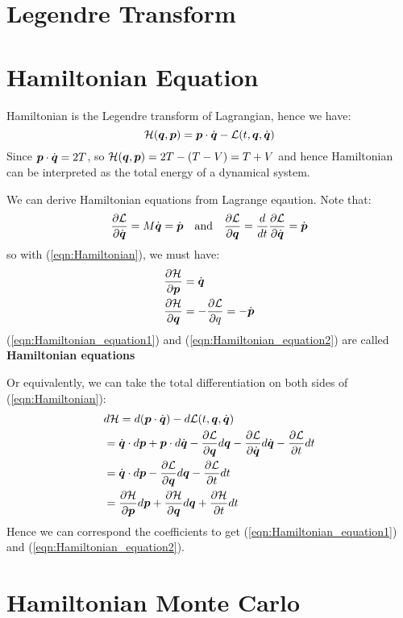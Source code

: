 \documentclass[hidelinks]{article}[12pt]
\begin{document}
\section{Legendre Transform}



\section{Hamiltonian Equation}
Hamiltonian is the Legendre transform of Lagrangian, hence we have:
\begin{equation}
{\cal H}(\boldsymbol{q}, \boldsymbol{p}) = \boldsymbol{p} \cdot \dot{\boldsymbol{q}} - {\cal L}(t, \boldsymbol{q}, \dot{\boldsymbol{q}}) \label{eqn:Hamiltonian}
\end{equation}
Since $\boldsymbol{p}\cdot \dot{\boldsymbol{q}} = 2T$, so ${\cal H}(\boldsymbol{q}, \boldsymbol{p}) = 2T - (T - V) = T + V$ and hence Hamiltonian can be interpreted as the total energy of a dynamical system.


We can derive Hamiltonian equations from Lagrange eqaution. Note that:\[\frac{\partial{{\cal L}}}{\partial{\dot{\boldsymbol{q}}}} = M\dot{\boldsymbol{q}} = \dot{\boldsymbol{p}} \quad \text{and} \quad \frac{\partial{{\cal L}}}{\partial{\boldsymbol{q}}} = \frac{d}{dt}\frac{\partial{{\cal L}}}{\partial{\dot{\boldsymbol{q}}}} = \dot{\boldsymbol{p}}\]
so with (\ref{eqn:Hamiltonian}), we must have:
\begin{align}
& \frac{\partial{{\cal H}}}{\partial{\boldsymbol{p}}} = \dot{\boldsymbol{q}} \label{eqn:Hamiltonian_equation1}\\
& \frac{\partial{{\cal H}}}{\partial{\boldsymbol{q}}} = -\frac{\partial{{\cal L}}}{\partial{q}} = - \dot{\boldsymbol{p}} \label{eqn:Hamiltonian_equation2}
\end{align}
(\ref{eqn:Hamiltonian_equation1}) and (\ref{eqn:Hamiltonian_equation2}) are called \textbf{Hamiltonian equations}

Or equivalently, we can take the total differentiation on both sides of (\ref{eqn:Hamiltonian}):
\begin{align*}
& d{\cal H} = d(\boldsymbol{p}\cdot \dot{\boldsymbol{q}}) - d{\cal L}(t, \boldsymbol{q}, \dot{\boldsymbol{q}})\\
& = \dot{\boldsymbol{q}}\cdot d\boldsymbol{p} + \boldsymbol{p} \cdot d\dot{\boldsymbol{q}} - \frac{\partial{{\cal L}}}{\partial{\boldsymbol{q}}}d\boldsymbol{q} - \frac{\partial{{\cal L}}}{\partial{\dot{\boldsymbol{q}}}}d\dot{\boldsymbol{q}} - \frac{\partial{{\cal L}}}{\partial{t}}dt\\
& = \dot{\boldsymbol{q}}\cdot d\boldsymbol{p} - \frac{\partial{{\cal L}}}{\partial{\boldsymbol{q}}}d\boldsymbol{q} - \frac{\partial{{\cal L}}}{\partial{t}}dt\\
& = \frac{\partial{{\cal H}}}{\partial{\boldsymbol{p}}}d\boldsymbol{p} + \frac{\partial{{\cal H}}}{\partial{\boldsymbol{q}}} d\boldsymbol{q} + \frac{\partial{{\cal H}}}{\partial{t}}dt
\end{align*}
Hence we can correspond the coefficients to get (\ref{eqn:Hamiltonian_equation1}) and (\ref{eqn:Hamiltonian_equation2}).

\section{Hamiltonian Monte Carlo}
\end{document}
